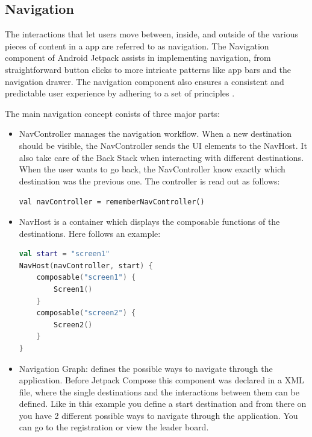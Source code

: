 \subsection{Navigation}
\label{cha:navigation}

The interactions that let users move between, inside, and outside of the various pieces of content in a app are referred to as navigation. The Navigation component of Android Jetpack assists in implementing navigation, from straightforward button clicks to more intricate patterns like app bars and the navigation drawer. The navigation component also ensures a consistent and predictable user experience by adhering to a set of principles \cite{android_navigation}.

The main navigation concept conists of three major parts:
\begin{itemize}
    \item NavController manages the navigation workflow. When a new destination should be visible, the NavController sends the UI elements to the NavHost. It also take care of the Back Stack when interacting with different destinations. When the user wants to go back, the NavController know exactly which destination was the previous one. The controller is read out as follows:
    
    \noindent
    \lstinline{val navController = rememberNavController()}
    
    \item NavHost is a container which displays the composable functions of the destinations. Here follows an example:
    
\begin{lstlisting}[language=Kotlin]
val start = "screen1"
NavHost(navController, start) {
    composable("screen1") {
        Screen1()
    }
    composable("screen2") {
        Screen2()
    }
}
\end{lstlisting}

    \item Navigation Graph: defines the possible ways to navigate through the application. Before Jetpack Compose this component was declared in a XML file, where the single destinations and the interactions between them can be defined. Like in this example \cite{Figure_3} you define a start destination and from there on you have 2 different possible ways to navigate through the application. You can go to the registration or view the leader board.
    

\end{itemize}
